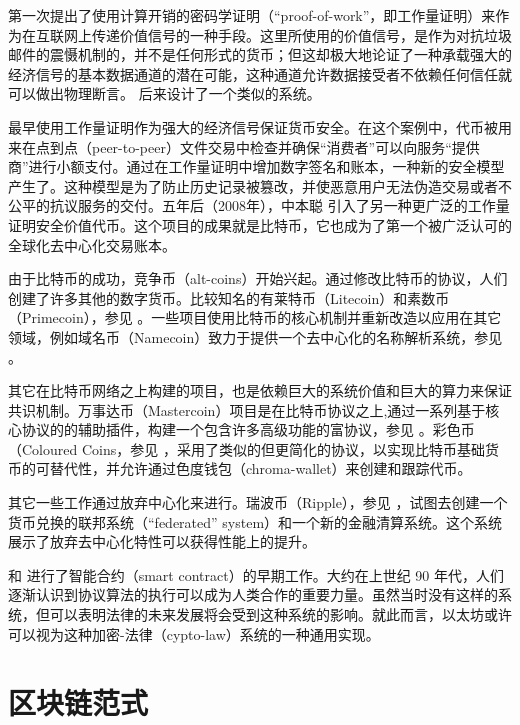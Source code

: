 \documentclass[9pt,oneside]{amsart}
\begin{document}
\begin{multicols}{2}
\cite{dwork92pricingvia} 第一次提出了使用计算开销的密码学证明（“proof-of-work”，即工作量证明）来作为在互联网上传递价值信号的一种手段。这里所使用的价值信号，是作为对抗垃圾邮件的震慑机制的，并不是任何形式的货币；但这却极大地论证了一种承载强大的经济信号的基本数据通道的潜在可能，这种通道允许数据接受者不依赖任何信任就可以做出物理断言。\cite{back2002hashcash} 后来设计了一个类似的系统。

\cite{vishnumurthy03karma:a} 最早使用工作量证明作为强大的经济信号保证货币安全。在这个案例中，代币被用来在点到点（peer-to-peer）文件交易中检查并确保“消费者”可以向服务“提供商”进行小额支付。通过在工作量证明中增加数字签名和账本，一种新的安全模型产生了。这种模型是为了防止历史记录被篡改，并使恶意用户无法伪造交易或者不公平的抗议服务的交付。五年后（2008年），中本聪 \cite{nakamoto2008bitcoin} 引入了另一种更广泛的工作量证明安全价值代币。这个项目的成果就是比特币，它也成为了第一个被广泛认可的全球化去中心化交易账本。


由于比特币的成功，竞争币（alt-coins）开始兴起。通过修改比特币的协议，人们创建了许多其他的数字货币。比较知名的有莱特币（Litecoin）和素数币（Primecoin），参见 \cite{sprankel2013technical} 。一些项目使用比特币的核心机制并重新改造以应用在其它领域，例如域名币（Namecoin）致力于提供一个去中心化的名称解析系统，参见 \cite{aron2012bitcoin} 。

其它在比特币网络之上构建的项目，也是依赖巨大的系统价值和巨大的算力来保证共识机制。万事达币（Mastercoin）项目是在比特币协议之上,通过一系列基于核心协议的的辅助插件，构建一个包含许多高级功能的富协议，参见 \cite{mastercoin2013willett} 。彩色币（Coloured Coins，参见 \cite{colouredcoins2012rosenfeld} ，采用了类似的但更简化的协议，以实现比特币基础货币的可替代性，并允许通过色度钱包（chroma-wallet）来创建和跟踪代币。

其它一些工作通过放弃中心化来进行。瑞波币（Ripple），参见 \cite{boutellier2014pirates} ，试图去创建一个货币兑换的联邦系统（“federated” system）和一个新的金融清算系统。这个系统展示了放弃去中心化特性可以获得性能上的提升。

\cite{szabo1997formalizing} 和 \cite{miller1997future} 进行了智能合约（smart contract）的早期工作。大约在上世纪 90 年代，人们逐渐认识到协议算法的执行可以成为人类合作的重要力量。虽然当时没有这样的系统，但可以表明法律的未来发展将会受到这种系统的影响。就此而言，以太坊或许可以视为这种加密-法律（cypto-law）系统的一种通用实现。


\section{区块链范式} \label{ch:overview}


\end{multicols}
\end{document}
